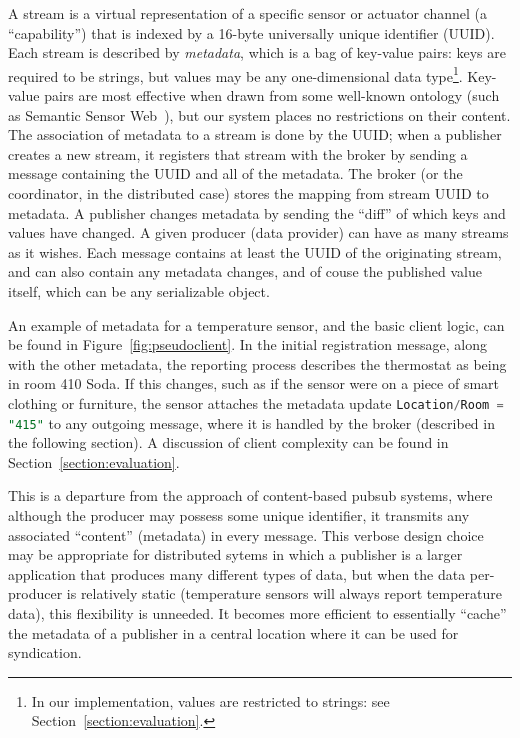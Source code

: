 A stream is a virtual representation of a specific sensor or actuator channel (a ``capability'') that is indexed by a 16-byte universally unique identifier (UUID).
Each stream is described by \emph{metadata}, which is a bag of key-value pairs: keys are required to be strings, but values may be any one-dimensional data type\footnote{In our implementation, values are restricted to strings: see Section~\ref{section:evaluation}.}.
Key-value pairs are most effective when drawn from some well-known ontology (such as Semantic Sensor Web~\cite{sheth2008semantic}), but our system places no restrictions on their content.
The association of metadata to a stream is done by the UUID; when a publisher creates a new stream, it registers that stream with the broker by sending a message containing the UUID and all of the metadata.
The broker (or the coordinator, in the distributed case) stores the mapping from stream UUID to metadata.
A publisher changes metadata by sending the ``diff'' of which keys and values have changed.
A given producer (data provider) can have as many streams as it wishes.
Each message contains at least the UUID of the originating stream, and can also contain any metadata changes, and of couse the published value itself, which can be any serializable object.

An example of metadata for a temperature sensor, and the basic client logic, can be found in Figure~\ref{fig:pseudoclient}.
In the initial registration message, along with the other metadata, the reporting process describes the thermostat as being in room 410 Soda.
If this changes, such as if the sensor were on a piece of smart clothing or furniture, the sensor attaches the metadata update \lstinline[language=SQL,basicstyle=\ttfamily]{Location/Room = "415"} to any outgoing message, where it is handled by the broker (described in the following section).
A discussion of client complexity can be found in Section~\ref{section:evaluation}.

This is a departure from the approach of content-based pubsub systems, where although the producer may possess some unique identifier, it transmits any associated ``content'' (metadata) in every message.
This verbose design choice may be appropriate for distributed sytems in which a publisher is a larger application that produces many different types of data, but when the data per-producer is relatively static (temperature sensors will always report temperature data), this flexibility is unneeded.
It becomes more efficient to essentially ``cache'' the metadata of a publisher in a central location where it can be used for syndication.

